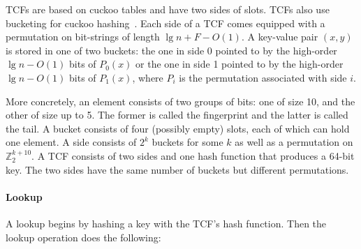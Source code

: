 \documentclass[letterpaper,twocolumn,10pt]{article}
\newcommand{\ints}{\mathbb{Z}}
\newcommand{\dotcup}{\ensuremath{\mathaccent\cdot\cup}}
\begin{document}
TCFs are based on cuckoo tables and have two sides of slots.
TCFs also use bucketing for cuckoo hashing~\cite{buckets}.
Each side of a TCF comes equipped with a permutation on bit-strings of length $\lg n + F - O(1)$.
A key-value pair $(x, y)$ is stored in one of two buckets: the one in side 0 pointed to by the high-order $\lg n - O(1)$ bits of $P_0(x)$ or the one in side 1 pointed to by the high-order $\lg n - O(1)$ bits of $P_1(x)$, where $P_i$ is the permutation associated with side $i$.

More concretely, an element consists of two groups of bits: one of size 10, and the other of size up to 5.
The former is called the fingerprint and the latter is called the tail.
A bucket consists of four (possibly empty) slots, each of which can hold one element.
A side consists of $2^k$ buckets for some $k$ as well as a permutation on $\ints_2^{k+10}$. %
A TCF consists of two sides and one hash function that produces a 64-bit key.
The two sides have the same number of buckets but different permutations.


\paragraph{Lookup}
A lookup begins by hashing a key with the TCF's hash function. %
Then the lookup operation does the following:
\end{document}
